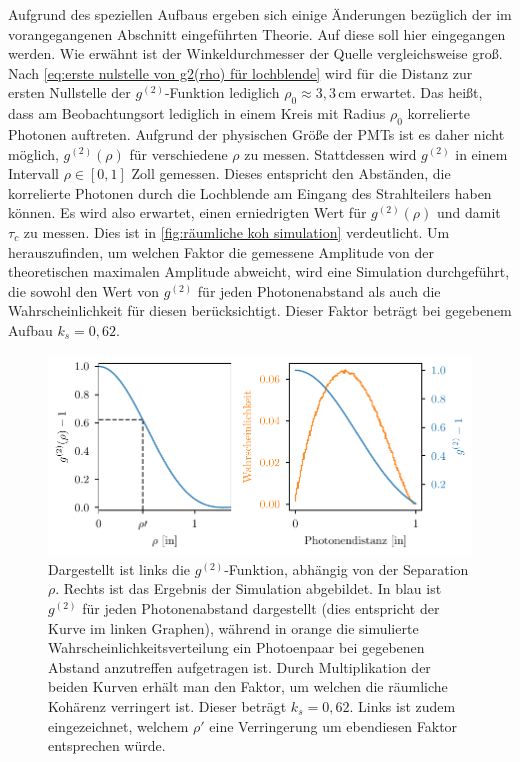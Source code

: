 Aufgrund des speziellen Aufbaus ergeben sich einige Änderungen bezüglich der im vorangegangenen Abschnitt eingeführten Theorie. 
Auf diese soll hier eingegangen werden. 
Wie erwähnt ist der Winkeldurchmesser der Quelle vergleichsweise groß. 
Nach \autoref{eq:erste nulstelle von g2(rho) für lochblende} wird für die Distanz zur ersten Nullstelle der $g^{(2)}$-Funktion lediglich $\rho_0\approx3,3\,\mathrm{cm}$ erwartet. 
Das heißt, dass am Beobachtungsort lediglich in einem Kreis mit Radius $\rho_0$ korrelierte Photonen auftreten. 
Aufgrund der physischen Größe der PMTs ist es daher nicht möglich, $g^{(2)}(\rho)$ für verschiedene $\rho$ zu messen. 
Stattdessen wird $g^{(2)}$ in einem Intervall $\rho\in[0,1]$ Zoll gemessen. 
Dieses entspricht den Abständen, die korrelierte Photonen durch die Lochblende am Eingang des Strahlteilers haben können. 
Es wird also erwartet, einen erniedrigten Wert für $g^{(2)}(\rho)$ und damit $\tau_c$ zu messen. 
Dies ist in \autoref{fig:räumliche koh simulation} verdeutlicht. 
Um herauszufinden, um welchen Faktor die gemessene Amplitude von der theoretischen maximalen Amplitude abweicht, wird eine Simulation durchgeführt, die sowohl den Wert von $g^{(2)}$ für jeden Photonenabstand als auch die Wahrscheinlichkeit für diesen berücksichtigt. 
Dieser Faktor beträgt bei gegebenem Aufbau $k_s=0,62$. 
\begin{figure}[htbp]
    \centering
    \includegraphics{images/Aufbau/g2(rho).pdf}
    \caption{Dargestellt ist links die $g^{(2)}$-Funktion, abhängig von der Separation $\rho$. Rechts ist das Ergebnis der Simulation abgebildet. In blau ist $g^{(2)}$ für jeden Photonenabstand dargestellt (dies entspricht der Kurve im linken Graphen), während in orange die simulierte Wahrscheinlichkeitsverteilung ein Photoenpaar bei gegebenen Abstand anzutreffen aufgetragen ist. Durch Multiplikation der beiden Kurven erhält man den Faktor, um welchen die räumliche Kohärenz verringert ist. Dieser beträgt $k_s=0,62$. Links ist zudem eingezeichnet, welchem $\rho\prime$ eine Verringerung um ebendiesen Faktor entsprechen würde. }
    \label{fig:räumliche koh simulation}
\end{figure}
